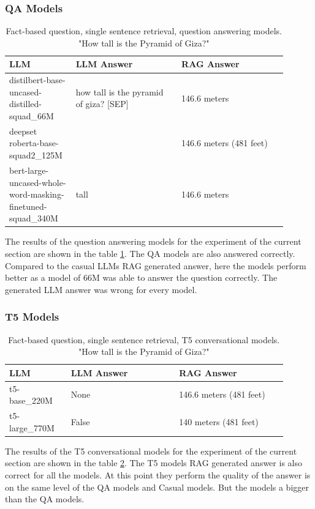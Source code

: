 \documentclass{wseas}
\begin{document}
\subsubsection{QA Models}

\begin{table}[htbp]
  \caption{Fact-based question, single sentence retrieval, question answering models. "How tall is the Pyramid of Giza?"} %
  \centering
  \label{tab:experiment_R_1_sentence_Q_fact_M_question_answering_table}  %
    \begin{tabular}{|p{0.2\linewidth}|p{0.35\linewidth}|p{0.35\linewidth}|}
      \hline
      \textbf{LLM} & \textbf{LLM Answer} & \textbf{RAG Answer} \\ \hline
      distilbert-base-uncased-distilled-squad\_66M & how tall is the pyramid of giza? {[}SEP{]} & 146.6 meters \\ \hline
      deepset roberta-base-squad2\_125M &  & 146.6 meters (481 feet) \\ \hline
      bert-large-uncased-whole-word-masking-finetuned-squad\_340M & tall & 146.6 meters \\ \hline
    \end{tabular}
\end{table}
The results of the question answering models for the experiment of the 
current section are shown in the table \ref{tab:experiment_R_1_sentence_Q_fact_M_question_answering_table}.
The QA models are also answered correctly. Compared to the casual LLMs
RAG generated answer, here the models perform better as a model of 66M
was able to answer the question correctly. The generated LLM answer was
wrong for every model.

\subsubsection{T5 Models}

\begin{table}[htbp]
  \centering
  \caption{Fact-based question, single sentence retrieval, T5 conversational models. "How tall is the Pyramid of Giza?"} %
  \label{tab:experiment_R_1_sentence_Q_fact_M_T5_table}  %
  \begin{tabular}{|p{0.2\linewidth}|p{0.35\linewidth}|p{0.35\linewidth}|}
    \hline
    \textbf{LLM} & \textbf{LLM Answer} & \textbf{RAG Answer} \\ \hline
    t5-base\_220M & None & 146.6 meters (481 feet) \\ \hline
    t5-large\_770M & False & 140 meters (481 feet) \\ \hline
  \end{tabular}
\end{table}
The results of the T5 conversational models for the experiment of the 
current section are shown in the table \ref{tab:experiment_R_1_sentence_Q_fact_M_T5_table}.
The T5 models RAG generated answer is also correct for all the models.
At this point they perform the quality of the answer is on the same
level of the QA models and Casual models. But the models a bigger than
the QA models.
\end{document}
